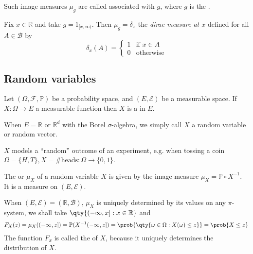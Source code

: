 \begin{remark}
	Such image measures $\mu_g$ are called  associated with $g$, where $g$ is the .
\end{remark}

\begin{example}
	Fix $x \in \mathbb{R}$ and take $g = 1_{[x,\infty)}$.
	Then $\mu_g = \delta_x$ the \emph{dirac measure at $x$} defined for all $A \in \mathcal{B}$ by
	\[ \delta_x(A) = \begin{cases}
		1 & \text{if } x \in A \\
		0 & \text{otherwise}
	\end{cases} \]
\end{example}

\subsection{Random variables}

\begin{definition}
	Let $(\Omega, \mathcal F, \mathbb P)$ be a probability space, and $(E, \mathcal E)$ be a measurable space.
	If $X : \Omega \to E$ a measurable function then $X$ is a  in $E$.
\end{definition}
When $E = \mathbb R$ or $\mathbb R^d$ with the Borel $\sigma$-algebra, we simply call $X$ a random variable or random vector.

\begin{example}
	$X$ models a ``random'' outcome of an experiment, e.g. when tossing a coin $\Omega = \{H, T\}, X = \text{\# heads} : \Omega \to \{0, 1\}$.
\end{example}

\begin{definition}[Distribution]
	The  or  $\mu_X$ of a random variable $X$ is given by the image measure $\mu_X = \mathbb P \circ X^{-1}$.
	It is a measure on $(E, \mathcal{E})$.

	When $(E, \mathcal{E}) = (\mathbb{R}, \mathcal{B})$, $\mu_X$ is uniquely determined by its values on any $\pi$-system, we shall take $\qty{(-\infty, x] : x \in \mathbb{R}}$ and
	\begin{align*}
		F_X(z) = \mu_X((-\infty, z]) = \mathbb P(X^{-1}(-\infty,z]) = \prob{\qty{\omega \in \Omega : X(\omega) \leq z}} = \prob{X \leq z}
	\end{align*}
	The function $F_x$ is called the  of $X$, because it uniquely determines the distribution of $X$.
\end{definition}

